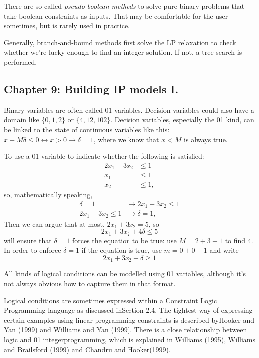 \documentclass[13pt, letterpaper, twoside]{book}
\begin{document}
There are so-called \textit{pseudo-boolean methods} to solve pure binary problems that take boolean constraints as inputs. That may be comfortable for the user sometimes, but is rarely used in practice.

Generally, branch-and-bound methods first solve the LP relaxation to check whether we're lucky enough to find an integer solution. If not, a tree search is performed. 

\subsection{Chapter 9: Building IP models I.}

Binary variables are often called 01-variables. Decision variables could also have a domain like $\{0,1,2\}$ or $\{4,12,102\}$. Decision variables, especially the 01 kind, can be linked to the state of continuous variables like this: $x-M\delta \leq 0 \leftrightarrow x>0 \rightarrow \delta = 1$, where we know that $x < M$ is always true.

To use a 01 variable to indicate whether the following is satisfied:
\begin{align}
2x_1 + 3x_2 &\leq 1\\
x_1 &\leq 1\\
x_2 &\leq 1,
\end{align}
so, mathematically speaking,
\begin{align}
\delta = 1 &\rightarrow 2x_1 + 3x_2 \leq 1\\
2x_1 + 3x_2 \leq 1 &\rightarrow \delta = 1,
\end{align}
Then we can argue that at most, $2x_1 + 3x_2 = 5$, so
\[
2x_1 + 3x_2 + 4\delta \leq 5
\]
will ensure that $\delta = 1$ forces the equation to be true: use $M = 2 + 3 - 1$ to find $4$. In order to enforce $\delta = 1$ if the equation is true, use $m = 0 + 0 -1$ and write
\[
2x_1 + 3x_2 + \delta \geq 1
\]

All kinds of logical conditions can be modelled using 01 variables, although it's not always obvious how to capture them in that format. 

Logical conditions are sometimes expressed within a Constraint Logic Programming language as discussed inSection 2.4. The tightest way of expressing certain examples using linear programming constraints is described byHooker and Yan (1999) and Williams and Yan (1999). There is a close relationship between logic and 01 integerprogramming, which is explained in Williams (1995), Williams and Brailsford (1999) and Chandru and Hooker(1999).
\end{document}
